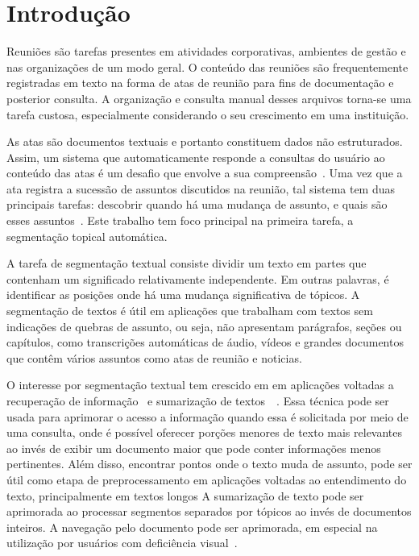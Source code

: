 

\section{Introdução}
	\label{sec:introducao}

Reuniões são tarefas presentes em atividades corporativas, ambientes de gestão e nas organizações de um modo geral. O conteúdo das reuniões são frequentemente registradas em texto na forma de atas de reunião para fins de documentação e posterior consulta. A organização e consulta manual desses arquivos torna-se uma tarefa custosa, especialmente considerando o seu crescimento em uma instituição. 

As atas são documentos textuais e portanto constituem dados não estruturados. Assim, um sistema que automaticamente responde a consultas do usuário ao conteúdo das atas é um desafio que envolve a sua compreensão~\cite{Bokaei2015}. 
Uma vez que a ata registra a sucessão de assuntos discutidos na reunião, tal sistema tem duas principais tarefas: descobrir quando há uma mudança de assunto, e quais são esses assuntos~\cite{Banerjee2006}. Este trabalho tem foco principal na primeira tarefa, a segmentação topical automática.



A tarefa de segmentação textual consiste dividir um texto em partes que contenham um significado relativamente independente. Em outras palavras, é identificar as posições onde há uma mudança significativa de tópicos. A segmentação de textos é útil em aplicações que trabalham com textos sem indicações de quebras de assunto, ou seja, não apresentam parágrafos, seções ou capítulos, como transcrições automáticas de áudio, vídeos e grandes documentos que contêm vários assuntos como atas de reunião e noticias.


O interesse por segmentação textual tem crescido em em aplicações voltadas a recuperação de informação~\cite{Reynar1999} %
e sumarização de textos~\cite{Boguraev2000}~\cite{Boguraev2000b}. %
Essa técnica pode ser usada para aprimorar o acesso a informação quando essa é solicitada por meio de uma consulta, onde é possível oferecer porções menores de texto mais relevantes ao invés de exibir um documento maior que pode conter informações menos pertinentes. 
%
Além disso, encontrar pontos onde o texto muda de assunto, pode ser útil como etapa de preprocessamento em aplicações voltadas ao entendimento do texto, principalmente em textos longos
%
A sumarização de texto pode ser aprimorada ao processar segmentos separados por tópicos ao invés de documentos inteiros. A navegação pelo documento pode ser aprimorada, em especial na utilização por usuários com deficiência visual~\cite{Choi2000}. 



